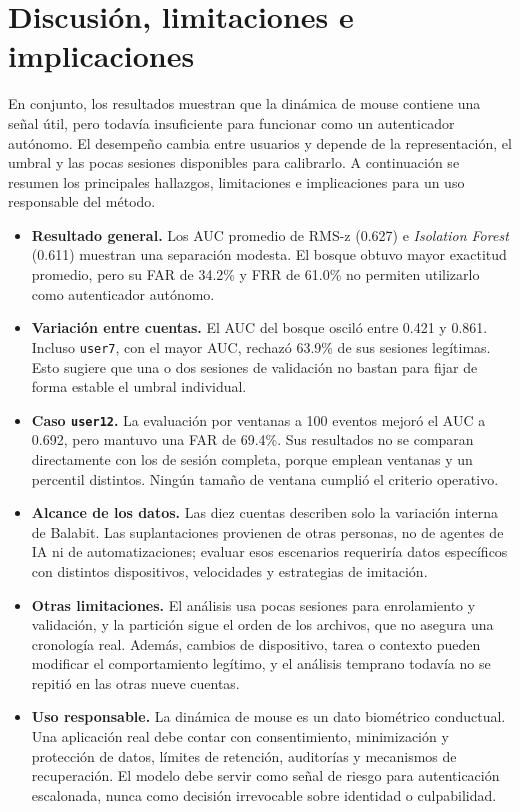\documentclass[11pt,letterpaper]{article}
\begin{document}
\section{Discusión, limitaciones e implicaciones}

En conjunto, los resultados muestran que la dinámica de mouse contiene una señal útil, pero todavía insuficiente para
funcionar como un autenticador autónomo. El desempeño cambia entre usuarios y depende de la representación, el umbral
y las pocas sesiones disponibles para calibrarlo. A continuación se resumen los principales hallazgos, limitaciones e
implicaciones para un uso responsable del método.

\begin{itemize}
  \item \textbf{Resultado general.} Los AUC promedio de RMS-z (0.627) e \emph{Isolation Forest} (0.611) muestran una
  separación modesta. El bosque obtuvo mayor exactitud promedio, pero su FAR de 34.2\% y FRR de 61.0\% no permiten
  utilizarlo como autenticador autónomo.
  \item \textbf{Variación entre cuentas.} El AUC del bosque osciló entre 0.421 y 0.861. Incluso \texttt{user7}, con el
  mayor AUC, rechazó 63.9\% de sus sesiones legítimas. Esto sugiere que una o dos sesiones de validación no bastan para
  fijar de forma estable el umbral individual.
  \item \textbf{Caso \texttt{user12}.} La evaluación por ventanas a 100 eventos mejoró el AUC a 0.692, pero mantuvo una
  FAR de 69.4\%. Sus resultados no se comparan directamente con los de sesión completa, porque emplean ventanas y un
  percentil distintos. Ningún tamaño de ventana cumplió el criterio operativo.
  \item \textbf{Alcance de los datos.} Las diez cuentas describen solo la variación interna de Balabit. Las
  suplantaciones provienen de otras personas, no de agentes de IA ni de automatizaciones; evaluar esos escenarios
  requeriría datos específicos con distintos dispositivos, velocidades y estrategias de imitación.
  \item \textbf{Otras limitaciones.} El análisis usa pocas sesiones para enrolamiento y validación, y la partición sigue
  el orden de los archivos, que no asegura una cronología real. Además, cambios de dispositivo, tarea o contexto pueden
  modificar el comportamiento legítimo, y el análisis temprano todavía no se repitió en las otras nueve cuentas.
  \item \textbf{Uso responsable.} La dinámica de mouse es un dato biométrico conductual. Una aplicación real debe contar
  con consentimiento, minimización y protección de datos, límites de retención, auditorías y mecanismos de
  recuperación. El modelo debe servir como señal de riesgo para autenticación escalonada, nunca como decisión
  irrevocable sobre identidad o culpabilidad.
\end{itemize}
\end{document}
